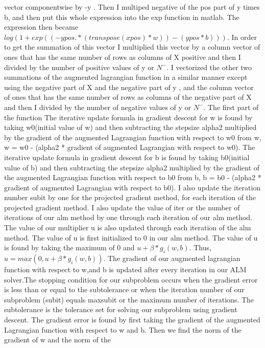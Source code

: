 \documentclass[11pt]{article}
\begin{document}
vector componentwise by -y . Then I multiped negative of the pos part of y times b, and then put this 
whole expression into the exp function in matlab. The expression then became $log(1+exp((-
ypos.*(transpose(xpos)*w)) - (ypos*b)))$. In order to get the summation of this vector I multiplied 
this vector by a column vector of ones that has the same number of rows as columns of X positive and 
then
I divided by the number of positive values of y or $N^-$. I vectorized the other two summations of the 
augmented lagrangian function  in a similar manner except using the negative part of X and the negative 
part of y , and the column vector of 
ones 
that has the same number of rows as columns of the negative part of X and then
I divided by the number of negative values of y or $N^-$.
The first part of the function   The 
iterative 
update 
formula in gradient descent for w is found by taking 
w0(initial value of w) and 
then 
subtracting the stepsize alpha2 multiplied by the gradient of the augmented Lagrangian function with 
respect 
to w0 from w, w = w0 - (alpha2 * gradient of augmented Lagrangian with respect to w0). The iterative 
update 
formula in gradient descent for b is found by taking 
b0(initial value of b) and 
then 
subtracting the stepsize alpha2 multiplied by the gradient of the augmented Lagrangian function with 
respect 
to b0 from b, b = b0 - (alpha2 * gradient of augmented Lagrangian with respect to b0). I also update the  
iteration number subit by one for the projected gradient method, for each iteration of the projected 
gradient method. I also update the value of iter or the number of iterations of our alm method by one 
through each iteration of our alm method. The value of our multiplier u is also updated through each 
iteration of the alm method. The value of u is first initialized to 0 in our alm method. The value of u 
is 
found by taking the maximum of 0 and $u+ \beta * g_{i}\left(w,b\right)$. Thus, $ u = max\left(0, u+ 
\beta 
*  g_{i}\left(w,b\right)\right)$. The 
gradient of our augmented lagrangian function with respect to w,and b is updated after every iteration 
in our ALM solver.The stopping condition for our subproblem occurs when the gradient 
error 
is less 
than or equal to  the subtolerance or when the iteration number of our subproblem (subit) equals 
maxsubit 
or the maximum number of iterations. 
The subtolerance is the tolerance set for 
solving our subproblem using 
gradient descent. The gradient error is found by first taking the gradient of the augmented Lagrangian 
function with respect to w and b. Then we find the norm of the gradient of w and the norm of the 
\end{document}
